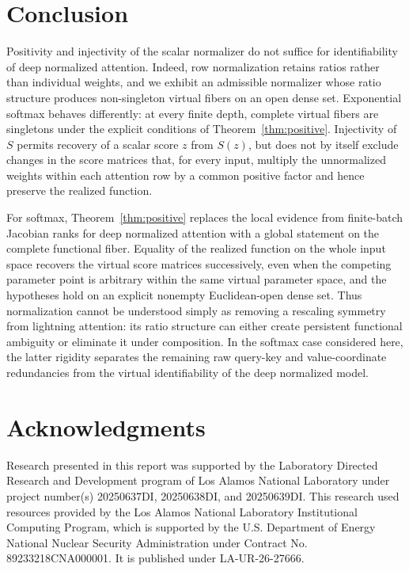 \documentclass[mlmain]{jmlr}
\begin{document}
\section{Conclusion}
\label{sec:conclusion}

Positivity and injectivity of the scalar normalizer do not suffice for
identifiability of deep normalized attention.
Indeed, row normalization retains ratios rather
than individual weights, and we exhibit an admissible normalizer whose ratio
structure produces non-singleton virtual fibers on an open dense set.
Exponential softmax behaves differently: at every finite depth, complete
virtual fibers are singletons under the explicit conditions of
Theorem~\ref{thm:positive}.  Injectivity of $S$ permits recovery of a scalar
score $z$ from $S(z)$, but does not by itself exclude changes in the score
matrices that, for every input, multiply the unnormalized weights within
each attention row by a common positive factor and hence preserve the
realized function.

For softmax, Theorem~\ref{thm:positive} replaces the local evidence from
finite-batch Jacobian ranks for deep normalized attention with a global statement on the complete functional
fiber.  Equality of the realized function on the whole input space recovers
the virtual score matrices successively, even when the competing parameter
point is arbitrary within the same virtual parameter space, and the hypotheses
hold on an explicit nonempty Euclidean-open dense set.  Thus normalization cannot be understood simply as
removing a rescaling symmetry from lightning attention: its ratio structure
can either create persistent functional ambiguity or eliminate it under
composition.  In the softmax case considered here, the latter rigidity
separates the remaining raw query-key and value-coordinate redundancies from
the virtual identifiability of the deep normalized model.
\clearpage
\section{Acknowledgments} 
Research presented in this report was
supported by the Laboratory Directed Research and Development program of Los Alamos National
Laboratory under project number(s) 20250637DI, 20250638DI, and 20250639DI. This research
used resources provided by the Los Alamos National Laboratory Institutional Computing
Program, which is supported by the U.S. Department of Energy National Nuclear Security
Administration under Contract No. 89233218CNA000001. It is published under  LA-UR-26-27666.
\end{document}

